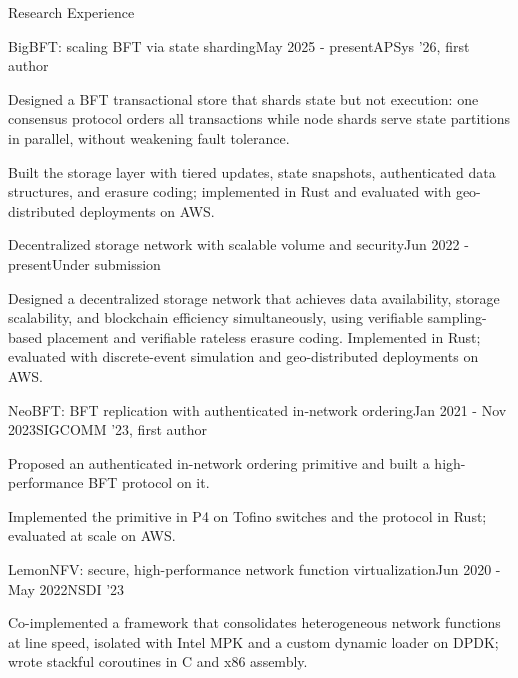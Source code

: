 \documentclass[
]{resume} %
\begin{document}
\begin{rSection}{Research Experience}
    \begin{rSubsection}{BigBFT: scaling BFT via state sharding}{May 2025 - present}{APSys '26, first author}{}
        \item Designed a BFT transactional store that shards state but not execution: one consensus protocol orders all transactions while node shards serve state partitions in parallel, without weakening fault tolerance.
        \item Built the storage layer with tiered updates, state snapshots, authenticated data structures, and erasure coding; implemented in Rust and evaluated with geo-distributed deployments on AWS.
    \end{rSubsection}

    \begin{rSubsection}{Decentralized storage network with scalable volume and security}{Jun 2022 - present}{Under submission}{}
        \item Designed a decentralized storage network that achieves data availability, storage scalability, and blockchain efficiency simultaneously, using verifiable sampling-based placement and verifiable rateless erasure coding.
            Implemented in Rust; evaluated with discrete-event simulation and geo-distributed deployments on AWS.
    \end{rSubsection}

    \begin{rSubsection}{NeoBFT: BFT replication with authenticated in-network ordering}{Jan 2021 - Nov 2023}{SIGCOMM '23, first author}{}
        \item Proposed an authenticated in-network ordering primitive and built a high-performance BFT protocol on it.
        \item Implemented the primitive in P4 on Tofino switches and the protocol in Rust; evaluated at scale on AWS.
    \end{rSubsection}

    \begin{rSubsection}{LemonNFV: secure, high-performance network function virtualization}{Jun 2020 - May 2022}{NSDI '23}{}
        \item Co-implemented a framework that consolidates heterogeneous network functions at line speed, isolated with Intel MPK and a custom dynamic loader on DPDK; wrote stackful coroutines in C and x86 assembly.
    \end{rSubsection}


\end{rSection}
\end{document}
